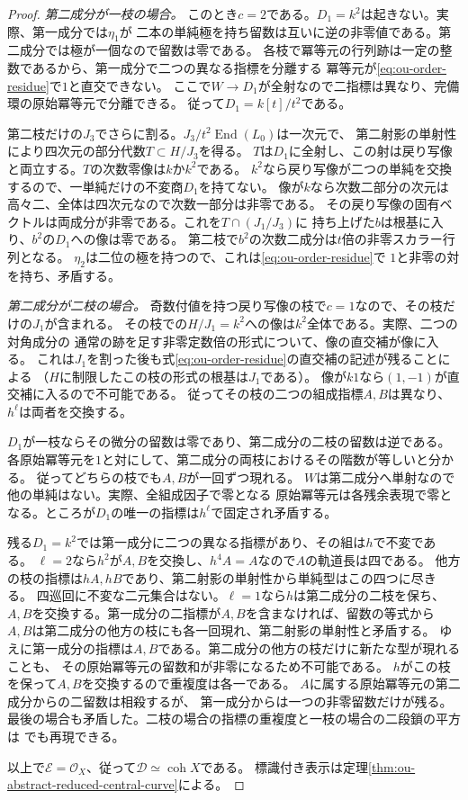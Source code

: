 \documentclass[11pt,a4paper]{ltjsarticle}
\theoremstyle{definition}
\newcommand{\coh}{\operatorname{coh}}
\begin{document}
\begin{proof}
\emph{第二成分が一枝の場合。}
このとき$c=2$である。$D_1=k^2$は起きない。実際、第一成分では$\eta_1$が
二本の単純極を持ち留数は互いに逆の非零値である。第二成分では極が一個なので留数は零である。
各枝で冪等元の行列跡は一定の整数であるから、第一成分で二つの異なる指標を分離する
冪等元が\eqref{eq:ou-order-residue}で$1$と直交できない。
ここで$W\to D_1$が全射なので二指標は異なり、完備環の原始冪等元で分離できる。
従って$D_1=k[t]/t^2$である。

第二枝だけの$J_3$でさらに割る。$J_3/t^2\operatorname{End}(L_0)$は一次元で、
第二射影の単射性により四次元の部分代数$T\subset H/J_3$を得る。
$T$は$D_1$に全射し、この射は戻り写像と両立する。$T$の次数零像は$k$か$k^2$である。
$k^2$なら戻り写像が二つの単純を交換するので、一単純だけの不変商$D_1$を持てない。
像が$k$なら次数二部分の次元は高々二、全体は四次元なので次数一部分は非零である。
その戻り写像の固有ベクトルは両成分が非零である。これを$T\cap(J_1/J_3)$に
持ち上げた$b$は根基に入り、$b^2$の$D_1$への像は零である。
第二枝で$b^2$の次数二成分は$t$倍の非零スカラー行列となる。
$\eta_2$は二位の極を持つので、これは\eqref{eq:ou-order-residue}で
$1$と非零の対を持ち、矛盾する。

\emph{第二成分が二枝の場合。}
奇数付値を持つ戻り写像の枝で$c=1$なので、その枝だけの$J_1$が含まれる。
その枝での$H/J_1=k^2$への像は$k^2$全体である。実際、二つの対角成分の
通常の跡を足す非零定数倍の形式について、像の直交補が像に入る。
これは$J_1$を割った後も式\eqref{eq:ou-order-residue}の直交補の記述が残ることによる
（$H$に制限したこの枝の形式の根基は$J_1$である）。
像が$k1$なら$(1,-1)$が直交補に入るので不可能である。
従ってその枝の二つの組成指標$A,B$は異なり、$h^\ell$は両者を交換する。

$D_1$が一枝ならその微分の留数は零であり、第二成分の二枝の留数は逆である。
各原始冪等元を$1$と対にして、第二成分の両枝におけるその階数が等しいと分かる。
従ってどちらの枝でも$A,B$が一回ずつ現れる。
$W$は第二成分へ単射なので他の単純はない。実際、全組成因子で零となる
原始冪等元は各残余表現で零となる。ところが$D_1$の唯一の指標は$h^\ell$で固定され矛盾する。

残る$D_1=k^2$では第一成分に二つの異なる指標があり、その組は$h$で不変である。
$\ell=2$なら$h^2$が$A,B$を交換し、$h^4A=A$なので$A$の軌道長は四である。
他方の枝の指標は$hA,hB$であり、第二射影の単射性から単純型はこの四つに尽きる。
四巡回に不変な二元集合はない。$\ell=1$なら$h$は第二成分の二枝を保ち、
$A,B$を交換する。第一成分の二指標が$A,B$を含まなければ、留数の等式から
$A,B$は第二成分の他方の枝にも各一回現れ、第二射影の単射性と矛盾する。
ゆえに第一成分の指標は$A,B$である。第二成分の他方の枝だけに新たな型が現れることも、
その原始冪等元の留数和が非零になるため不可能である。
$h$がこの枝を保って$A,B$を交換するので重複度は各一である。
$A$に属する原始冪等元の第二成分からの二留数は相殺するが、
第一成分からは一つの非零留数だけが残る。最後の場合も矛盾した。二枝の場合の指標の重複度と一枝の場合の二段鎖の平方は
でも再現できる。

以上で$\mathcal E=\mathcal O_X$、従って$\mathcal D\simeq\coh X$である。
標識付き表示は定理\ref{thm:ou-abstract-reduced-central-curve}による。
\end{proof}
\end{document}
